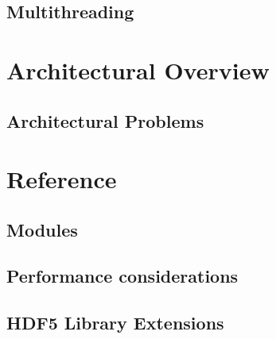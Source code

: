 \documentclass[letterpaper,hyper]{HDF}
\begin{document}
%

\section{Multithreading}\label{sec:tour8}


\chapter{Architectural Overview}\label{chap:arch}

\section{Architectural Problems}\label{sec:problems}


\chapter{Reference}\label{part:reference}

\section{Modules}


\section{Performance considerations}


\section{HDF5 Library Extensions}



\end{document}
